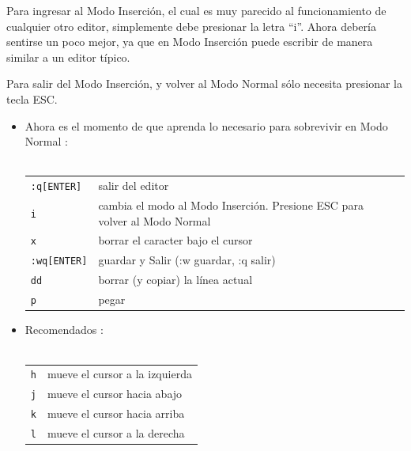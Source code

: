 \documentclass[12pt]{article}
\def\ti#1#2{\texttt{#1} & #2 \\ }
\begin{document}
Para ingresar al Modo Inserción, el cual es muy parecido al funcionamiento
de cualquier otro editor, simplemente debe presionar la letra ``i''.
Ahora debería sentirse un poco mejor, ya que en Modo Inserción puede
escribir de manera similar a un editor típico.

Para salir del Modo Inserción, y volver al Modo Normal sólo necesita
presionar la tecla ESC.



\begin{itemize}
	\item Ahora es el momento de que aprenda lo necesario para sobrevivir
en Modo Normal : \\ \\
\begin{tabular}{ l l l }
	\ti{:q[ENTER]}{salir del editor}
	\texttt{i} &  cambia el modo al Modo Inserción. Presione ESC para volver al Modo Normal \\
	\texttt{x} &  borrar el caracter bajo el cursor \\
	\texttt{:wq[ENTER]} & guardar y Salir (:w guardar, :q salir) \\
	\texttt{dd} &  borrar (y copiar) la línea actual \\
	\texttt{p} &  pegar \\
\end{tabular}
\end{itemize}

	

\begin{itemize}
	\item Recomendados : \\ \\
\begin{tabular}{ l l }
	\texttt{h} & mueve el cursor a la izquierda \\
	\texttt{j} & mueve el cursor hacia abajo \\
	\texttt{k} & mueve el cursor hacia arriba \\
	\texttt{l} & mueve el cursor a la derecha \\
\end{tabular}
\end{itemize}
\end{document}
